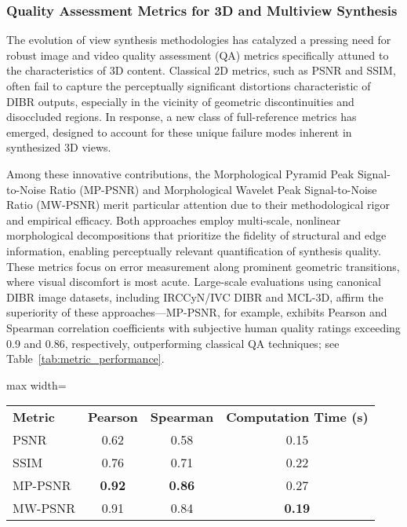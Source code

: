 \subsubsection{Quality Assessment Metrics for 3D and Multiview Synthesis}

The evolution of view synthesis methodologies has catalyzed a pressing need for robust image and video quality assessment (QA) metrics specifically attuned to the characteristics of 3D content. Classical 2D metrics, such as PSNR and SSIM, often fail to capture the perceptually significant distortions characteristic of DIBR outputs, especially in the vicinity of geometric discontinuities and disoccluded regions. In response, a new class of full-reference metrics has emerged, designed to account for these unique failure modes inherent in synthesized 3D views.

Among these innovative contributions, the Morphological Pyramid Peak Signal-to-Noise Ratio (MP-PSNR) and Morphological Wavelet Peak Signal-to-Noise Ratio (MW-PSNR) merit particular attention due to their methodological rigor and empirical efficacy. Both approaches employ multi-scale, nonlinear morphological decompositions that prioritize the fidelity of structural and edge information, enabling perceptually relevant quantification of synthesis quality. These metrics focus on error measurement along prominent geometric transitions, where visual discomfort is most acute. Large-scale evaluations using canonical DIBR image datasets, including IRCCyN/IVC DIBR and MCL-3D, affirm the superiority of these approaches—MP-PSNR, for example, exhibits Pearson and Spearman correlation coefficients with subjective human quality ratings exceeding 0.9 and 0.86, respectively, outperforming classical QA techniques; see Table~\ref{tab:metric_performance}.

\begin{table*}[htbp]
\centering
\caption{Comparison of quality assessment metrics on DIBR image datasets.}
\label{tab:metric_performance}
\begin{adjustbox}{max width=\textwidth}
\begin{tabular}{lccc}
\toprule
\textbf{Metric} & \textbf{Pearson} & \textbf{Spearman} & \textbf{Computation Time (s)} \\
PSNR     & 0.62 & 0.58 & 0.15 \\
SSIM     & 0.76 & 0.71 & 0.22 \\
MP-PSNR  & \textbf{0.92} & \textbf{0.86} & 0.27 \\
MW-PSNR  & 0.91 & 0.84 & \textbf{0.19} \\
\bottomrule
\end{tabular}
\end{adjustbox}
\end{table*}


